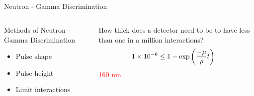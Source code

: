 \subsection*{}
\begin{frame}{Neutron - Gamma Discrimination}
  \begin{columns}[onlytextwidth]
    \begin{column}{0.45\textwidth}
    \large
    Methods of Neutron - Gamma Discrimination
    \normalsize
    \begin{itemize}
      \item Pulse shape 
      \item Pulse height
      \item Limit interactions
    \end{itemize}
    \end{column}
    \begin{column}{0.45\textwidth}
      How thick does a detector need to be to have less than one in a million interactions?
      \vspace{1cm}
      \begin{align*}
        \num{1E-6} &\le 1-\exp\left ( \frac{-\mu}{\rho}t \right )  
      \end{align*}
      \pause
      \huge
      \textcolor{red}{160 nm}
    \end{column}
  \end{columns}
\end{frame}
